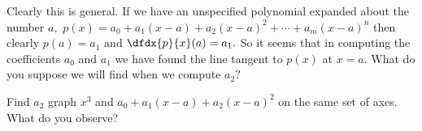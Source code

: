 Clearly this is general. If we have an unspecified polynomial expanded
about the number $a,$ $p(x) = a_0 + a_1(x-a) + a_2(x-a)^2 + \cdots +
a_m(x-a)^n$ then clearly $p(a) = a_1$ and $\dfdx{p}{x}(a) = a_1.$ So
it seems that in computing the coefficients $a_0$ and $a_1$ we have
found the line tangent to $p(x)$ at $x=a.$ What do you suppose we will
find when we compute $a_2?$
\begin{embeddedproblem}{}
 Find $a_2$ graph $x^3$ and $a_0 + a_1(x-a) + a_2(x-a)^2$
    on the same set of axes. What do you observe?
\end{embeddedproblem}



